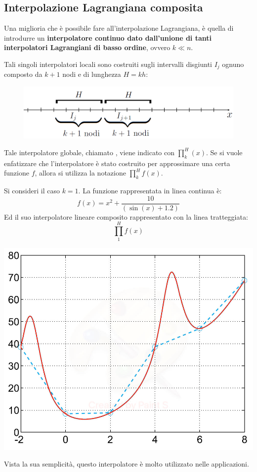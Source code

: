 \subsection{Interpolazione Lagrangiana composita}

Una miglioria che è possibile fare all'interpolazione Lagrangiana, è quella di introdurre un \textbf{interpolatore continuo dato dall'unione di tanti interpolatori Lagrangiani di basso ordine}, ovvero $k \ll n$.

\highspace
Tali singoli interpolatori locali sono costruiti sugli intervalli disgiunti $I_{j}$ ognuno composto da $k+1$ nodi e di lunghezza $H = kh$:

\begin{figure}[!htp]
	\centering
	\includegraphics[width=0.7\linewidth]{img/interpolazione-lagrangiana-composita-1.png}
\end{figure}

\noindent
Tale interpolatore globale, chiamato , viene indicato con $\prod_{k}^{H}\left(x\right)$. Se si vuole enfatizzare che l'interpolatore è stato costruito per approssimare una certa funzione $f$, allora si utilizza la notazione $\prod_{k}^{H} f\left(x\right)$.

\begin{examplebox}
	Si consideri il caso $k=1$. La funzione rappresentata in linea continua è:
	\begin{equation*}
		f\left(x\right) = x^{2} + \dfrac{10}{\left(\sin\left(x\right)+1.2\right)}
	\end{equation*}
	Ed il suo interpolatore lineare composito rappresentato con la linea tratteggiata:
	\begin{equation*}
		\displaystyle\prod_{1}^{H}f\left(x\right)
	\end{equation*}
	\begin{center}
		\includegraphics[width=.6\textwidth]{img/interpolazione-lagrangiana-composita-2.png}
	\end{center}
	
	\noindent
	Vista la sua semplicità, questo interpolatore è molto utilizzato nelle applicazioni.
\end{examplebox}


